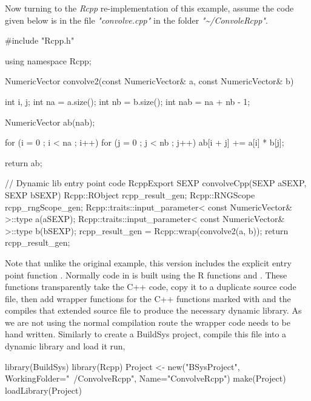 Now turning to the \emph{Rcpp} re-implementation of this example, assume the code given below is in the file \emph{"convolve.cpp"} in the folder \emph{"\textasciitilde/ConvoleRcpp"}.

\begin{Schunk}
  \begin{Sinput}
  #include "Rcpp.h"

  using namespace Rcpp;
  
  NumericVector convolve2(const NumericVector& a, 
                          const NumericVector& b)
  {
      int i, j;
      int na = a.size();
      int nb = b.size();
      int nab = na + nb - 1;
  
      NumericVector ab(nab);
  
      for (i = 0 ; i < na ; i++)
      {
          for (j = 0 ; j < nb ; j++)
          {
              ab[i + j] += a[i] * b[j];
          }
      }
  
      return ab;
  }
  
  // Dynamic lib entry point code
  RcppExport SEXP convolveCpp(SEXP aSEXP, SEXP bSEXP)
  {
      Rcpp::RObject rcpp_result_gen;
      Rcpp::RNGScope rcpp_rngScope_gen;
      Rcpp::traits::input_parameter< const NumericVector& >::type a(aSEXP);
      Rcpp::traits::input_parameter< const NumericVector& >::type b(bSEXP);
      rcpp_result_gen = Rcpp::wrap(convolve2(a, b));
      return rcpp_result_gen;
  }
  \end{Sinput}
\end{Schunk}

Note that unlike the original example, this version includes the explicit entry point function . 
Normally code in  is built using the R functions  and . These functions 
transparently take the C++ code, copy it to a duplicate source code file, then add wrapper functions for the C++ functions 
marked with  and the compiles that extended source file to produce the necessary dynamic library. As we are 
not using the normal  compilation route the wrapper code needs to be hand written. 
Similarly to create a BuildSys project, compile this file into a dynamic library and load it run,

\begin{Schunk}
  \begin{Sinput}
  library(BuildSys)
  library(Rcpp)
  Project <- new("BSysProject", WorkingFolder="~/ConvolveRcpp", Name="ConvolveRcpp")
  make(Project)
  loadLibrary(Project)
  \end{Sinput}
\end{Schunk}

